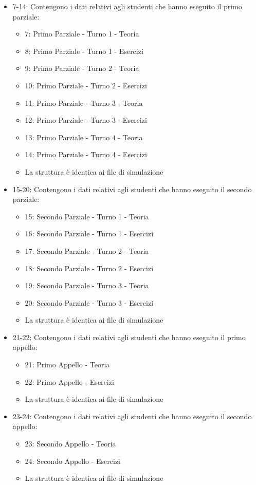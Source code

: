 \begin{itemize}
\item 7-14: Contengono i dati relativi agli studenti che hanno eseguito il primo parziale:
\begin{itemize}
   \item 7: Primo Parziale - Turno 1 - Teoria
   \item 8: Primo Parziale - Turno 1 - Esercizi
   \item 9: Primo Parziale - Turno 2 - Teoria
   \item 10: Primo Parziale - Turno 2 - Esercizi
   \item 11: Primo Parziale - Turno 3 - Teoria
   \item 12: Primo Parziale - Turno 3 - Esercizi
   \item 13: Primo Parziale - Turno 4 - Teoria
   \item 14: Primo Parziale - Turno 4 - Esercizi
   \item La struttura è identica ai file di simulazione
\end{itemize}

\item 15-20: Contengono i dati relativi agli studenti che hanno eseguito il secondo parziale:
\begin{itemize}
   \item 15: Secondo Parziale - Turno 1 - Teoria
   \item 16: Secondo Parziale - Turno 1 - Esercizi
   \item 17: Secondo Parziale - Turno 2 - Teoria
   \item 18: Secondo Parziale - Turno 2 - Esercizi
   \item 19: Secondo Parziale - Turno 3 - Teoria
   \item 20: Secondo Parziale - Turno 3 - Esercizi
   \item La struttura è identica ai file di simulazione
\end{itemize}

\item 21-22: Contengono i dati relativi agli studenti che hanno eseguito il primo appello:
\begin{itemize}
   \item 21: Primo Appello - Teoria
   \item 22: Primo Appello - Esercizi
   \item La struttura è identica ai file di simulazione
\end{itemize}

\item 23-24: Contengono i dati relativi agli studenti che hanno eseguito il secondo appello:
\begin{itemize}
   \item 23: Secondo Appello - Teoria
   \item 24: Secondo Appello - Esercizi
   \item La struttura è identica ai file di simulazione
\end{itemize}

\end{itemize} 

